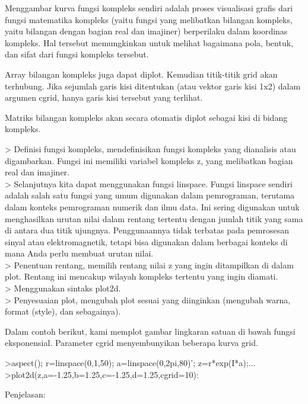 \documentclass[a4paper,10pt]{article}
\begin{document}
\begin{eulernotebook}
\begin{eulercomment}
\begin{eulercomment}
\begin{eulercomment}
\begin{eulercomment}
\begin{eulercomment}
\begin{eulercomment}
\begin{eulercomment}
Menggambar kurva fungsi kompleks sendiri adalah proses visualisasi
grafis dari fungsi matematika kompleks (yaitu fungsi yang melibatkan
bilangan kompleks, yaitu bilangan dengan bagian real dan imajiner)
berperilaku dalam koordinas kompleks. Hal tersebut memungkinkan untuk
melihat bagaimana pola, bentuk, dan sifat dari fungsi kompleks
tersebut.

Array bilangan kompleks juga dapat diplot. Kemudian titik-titik grid
akan terhubung. Jika sejumlah garis kisi ditentukan (atau vektor garis
kisi 1x2) dalam argumen cgrid, hanya garis kisi tersebut yang
terlihat.

Matriks bilangan kompleks akan secara otomatis diplot sebagai kisi di
bidang kompleks.

\textgreater{} Definisi fungsi kompleks, mendefinisikan fungsi kompleks yang
dianalisis atau digambarkan. Fungsi ini memiliki variabel kompleks z,
yang melibatkan bagian real dan imajiner.\\
\textgreater{} Selanjutnya kita dapat menggunakan fungsi linspace. Fungsi linspace
sendiri adalah salah satu fungsi yang umum digunakan dalam
pemrograman, terutama dalam konteks pemrograman numerik dan ilmu data.
Ini sering digunakan untuk menghasilkan urutan nilai dalam rentang
tertentu dengan jumlah titik yang sama di antara dua titik ujungnya.
Penggunaannya tidak terbatas pada pemrosesan sinyal atau
elektromagnetik, tetapi bisa digunakan dalam berbagai konteks di mana
Anda perlu membuat urutan nilai.\\
\textgreater{} Penentuan rentang, memilih rentang nilai z yang ingin ditampilkan di
dalam plot. Rentang ini mencakup wilayah kompleks tertentu yang ingin
diamati.\\
\textgreater{} Menggunakan sintaks plot2d.\\
\textgreater{} Penyesuaian plot, mengubah plot sesuai yang diinginkan (mengubah
warna, format (style), dan sebagainya).

Dalam contoh berikut, kami memplot gambar lingkaran satuan di bawah
fungsi eksponensial. Parameter cgrid menyembunyikan beberapa kurva
grid.

\begin{eulercomment}
\begin{eulerprompt}
>aspect(); r=linspace(0,1,50); a=linspace(0,2pi,80)'; z=r*exp(I*a);...
>plot2d(z,a=-1.25,b=1.25,c=-1.25,d=1.25,cgrid=10):
\end{eulerprompt}
\begin{eulercomment}
Penjelasan:


\end{eulercomment}
\end{eulercomment}
\end{eulercomment}
\end{eulercomment}
\end{eulercomment}
\end{eulercomment}
\end{eulercomment}
\end{eulercomment}
\end{eulercomment}
\end{eulernotebook}
\end{document}
